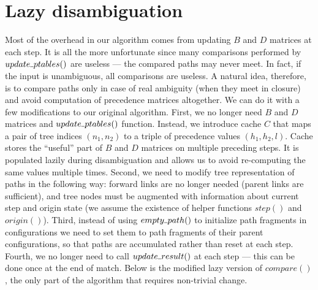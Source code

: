 \documentclass[AMA,STIX1COL]{WileyNJD-v2}
\newcommand{\Xund}{\rule{.4em}{.4pt}}
\begin{document}
\section{Lazy disambiguation}\label{section_lazy}

Most of the overhead in our algorithm comes from updating $B$ and $D$ matrices at each step.
It is all the more unfortunate since many comparisons performed by $update \Xund ptables ()$ are useless ---
the compared paths may never meet.
In fact, if the input is unambiguous, all comparisons are useless.
%
A natural idea, therefore, is to compare paths only in case of real ambiguity (when they meet in closure)
and avoid computation of precedence matrices altogether.
%
We can do it with a few modifications to our original algorithm.
%
First, we no longer need $B$ and $D$ matrices and $update \Xund ptables ()$ function.
Instead, we introduce cache $C$ that maps a pair of tree indices $(n_1, n_2)$ to a triple of precedence values $(h_1, h_2, l)$.
Cache stores the ``useful'' part of $B$ and $D$ matrices on multiple preceding steps.
It is populated lazily during disambiguation
and allows us to avoid re-computing the same values multiple times.
%
Second, we need to modify tree representation of paths in the following way:
forward links are no longer needed (parent links are sufficient),
and tree nodes must be augmented with information about current step and origin state (we assume the existence of helper functions $step()$ and $origin()$).
%
Third, instead of using $empty \Xund path ()$ to initialize path fragments in configurations
we need to set them to path fragments of their parent configurations,
so that paths are accumulated rather than reset at each step.
%
Fourth, we no longer need to call $update \Xund result ()$ at each step --- this can be done once at the end of match.
%
Below is the modified lazy version of $compare()$, the only part of the algorithm that requires non-trivial change.
\\
\end{document}
